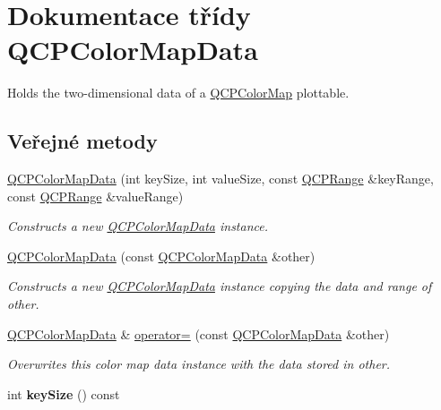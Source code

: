 \hypertarget{classQCPColorMapData}{}\section{Dokumentace třídy Q\+C\+P\+Color\+Map\+Data}
\label{classQCPColorMapData}


Holds the two-\/dimensional data of a \hyperlink{classQCPColorMap}{Q\+C\+P\+Color\+Map} plottable.  


\subsection*{Veřejné metody}
\begin{DoxyCompactItemize}
\item 
\hyperlink{classQCPColorMapData_aac9d8eb81e18e240d89d56c01933fd23}{Q\+C\+P\+Color\+Map\+Data} (int key\+Size, int value\+Size, const \hyperlink{classQCPRange}{Q\+C\+P\+Range} \&key\+Range, const \hyperlink{classQCPRange}{Q\+C\+P\+Range} \&value\+Range)
\begin{DoxyCompactList}\small\item\em Constructs a new \hyperlink{classQCPColorMapData}{Q\+C\+P\+Color\+Map\+Data} instance. \end{DoxyCompactList}\item 
\hypertarget{classQCPColorMapData_a7f2145d86473263494abb9bf1de20436}{}\hyperlink{classQCPColorMapData_a7f2145d86473263494abb9bf1de20436}{Q\+C\+P\+Color\+Map\+Data} (const \hyperlink{classQCPColorMapData}{Q\+C\+P\+Color\+Map\+Data} \&other)\label{classQCPColorMapData_a7f2145d86473263494abb9bf1de20436}

\begin{DoxyCompactList}\small\item\em Constructs a new \hyperlink{classQCPColorMapData}{Q\+C\+P\+Color\+Map\+Data} instance copying the data and range of {\itshape other}. \end{DoxyCompactList}\item 
\hypertarget{classQCPColorMapData_afdf4dd1b2f5714234fe84709b85c2a8d}{}\hyperlink{classQCPColorMapData}{Q\+C\+P\+Color\+Map\+Data} \& \hyperlink{classQCPColorMapData_afdf4dd1b2f5714234fe84709b85c2a8d}{operator=} (const \hyperlink{classQCPColorMapData}{Q\+C\+P\+Color\+Map\+Data} \&other)\label{classQCPColorMapData_afdf4dd1b2f5714234fe84709b85c2a8d}

\begin{DoxyCompactList}\small\item\em Overwrites this color map data instance with the data stored in {\itshape other}. \end{DoxyCompactList}\item 
\hypertarget{classQCPColorMapData_aa8d7811686fdfea964947715210c4af8}{}int {\bfseries key\+Size} () const \label{classQCPColorMapData_aa8d7811686fdfea964947715210c4af8}


\end{DoxyCompactItemize}
